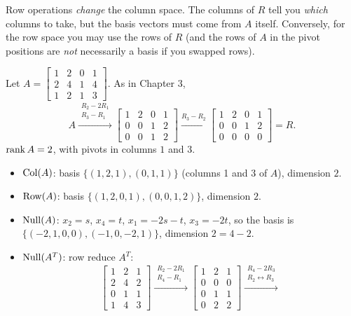 \begin{important}[Pitfall]
Row operations \emph{change} the column space. The columns of $R$ tell you \emph{which} columns
to take, but the basis vectors must come from $A$ itself. Conversely, for the row space you may use
the rows of $R$ (and the rows of $A$ in the pivot positions are \emph{not} necessarily a basis if
you swapped rows).
\end{important}

\begin{example}
Let $A=\begin{bmatrix}1&2&0&1\\2&4&1&4\\1&2&1&3\end{bmatrix}$. As in Chapter 3,
\[
A\xrightarrow{\substack{R_2-2R_1\\R_3-R_1}}
\begin{bmatrix}1&2&0&1\\0&0&1&2\\0&0&1&2\end{bmatrix}
\xrightarrow{R_3-R_2}
\begin{bmatrix}1&2&0&1\\0&0&1&2\\0&0&0&0\end{bmatrix}=R .
\]
$\operatorname{rank} A=2$, with pivots in columns $1$ and $3$.
\begin{itemize}
  \item $\operatorname{Col}(A)$: basis $\{(1,2,1),(0,1,1)\}$ (columns 1 and 3 of $A$), dimension $2$.
  \item $\operatorname{Row}(A)$: basis $\{(1,2,0,1),(0,0,1,2)\}$, dimension $2$.
  \item $\operatorname{Null}(A)$: $x_2=s$, $x_4=t$, $x_1=-2s-t$, $x_3=-2t$, so the basis is
        $\{(-2,1,0,0),(-1,0,-2,1)\}$, dimension $2=4-2$.
  \item $\operatorname{Null}(A^T)$: row reduce $A^T$:
  \[
  \begin{bmatrix}1&2&1\\2&4&2\\0&1&1\\1&4&3\end{bmatrix}
  \xrightarrow{\substack{R_2-2R_1\\R_4-R_1}}
  \begin{bmatrix}1&2&1\\0&0&0\\0&1&1\\0&2&2\end{bmatrix}
  \xrightarrow{\substack{R_4-2R_3\\R_2\leftrightarrow R_3}}
\]
\end{itemize}
\end{example}
